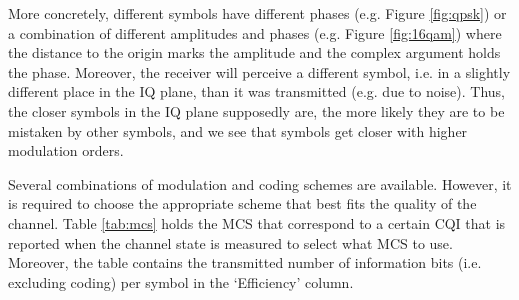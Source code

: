 
More concretely, different symbols have different phases (e.g. Figure \ref{fig:qpsk}) or a combination of different amplitudes and phases (e.g. Figure \ref{fig:16qam}) where the distance to the origin marks the amplitude and the complex argument holds the phase. Moreover, the receiver will perceive a different symbol, i.e. in a slightly different place in the \ac{IQ} plane, than it was transmitted (e.g. due to noise). Thus, the closer symbols in the \ac{IQ} plane supposedly are, the more likely they are to be mistaken by other symbols, and we see that symbols get closer with higher modulation orders.

Several combinations of modulation and coding schemes are available. However, it is required to choose the appropriate scheme that best fits the quality of the channel. Table \ref{tab:mcs} holds the \acs{MCS} that correspond to a certain \ac{CQI} that is reported when the channel state is measured to select what \ac{MCS} to use. Moreover, the table contains the transmitted number of information bits (i.e. excluding coding) per symbol in the `Efficiency' column.

